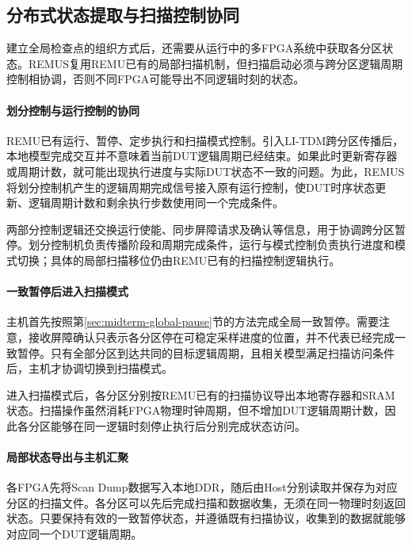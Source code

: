 \subsection{分布式状态提取与扫描控制协同}
\label{sec:midterm-scan-control}

建立全局检查点的组织方式后，还需要从运行中的多FPGA系统中获取各分区状态。REMUS复用REMU已有的局部扫描机制，但扫描启动必须与跨分区逻辑周期控制相协调，否则不同FPGA可能导出不同逻辑时刻的状态。

\paragraph{划分控制与运行控制的协同}

REMU已有运行、暂停、定步执行和扫描模式控制。引入LI-TDM跨分区传播后，本地模型完成交互并不意味着当前DUT逻辑周期已经结束。如果此时更新寄存器或周期计数，就可能出现执行进度与实际DUT状态不一致的问题。为此，REMUS将划分控制机产生的逻辑周期完成信号接入原有运行控制，使DUT时序状态更新、逻辑周期计数和剩余执行步数使用同一个完成条件。

两部分控制逻辑还交换运行使能、同步屏障请求及确认等信息，用于协调跨分区暂停。划分控制机负责传播阶段和周期完成条件，运行与模式控制负责执行进度和模式切换；具体的局部扫描移位仍由REMU已有的扫描控制逻辑执行。

\paragraph{一致暂停后进入扫描模式}

主机首先按照第\ref{sec:midterm-global-pause}节的方法完成全局一致暂停。需要注意，接收屏障确认只表示各分区停在可稳定采样进度的位置，并不代表已经完成一致暂停。只有全部分区到达共同的目标逻辑周期，且相关模型满足扫描访问条件后，主机才协调切换到扫描模式。

进入扫描模式后，各分区分别按REMU已有的扫描协议导出本地寄存器和SRAM状态。扫描操作虽然消耗FPGA物理时钟周期，但不增加DUT逻辑周期计数，因此各分区能够在同一逻辑时刻停止执行后分别完成状态访问。

\paragraph{局部状态导出与主机汇聚}

各FPGA先将Scan Dump数据写入本地DDR，随后由Host分别读取并保存为对应分区的扫描文件。各分区可以先后完成扫描和数据收集，无须在同一物理时刻返回状态。只要保持有效的一致暂停状态，并遵循既有扫描协议，收集到的数据就能够对应同一个DUT逻辑周期。

